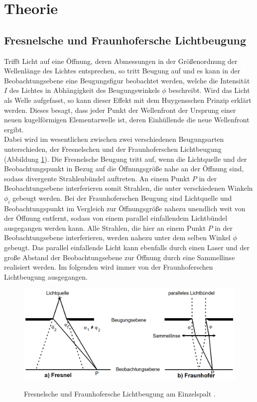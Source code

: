 
\section{Theorie}
\label{sec:Theorie}

\subsection{Fresnelsche und Fraunhofersche Lichtbeugung}

Trifft Licht auf eine Öffnung, deren Abmessungen in der Größenordnung der Wellenlänge des Lichtes entsprechen, so tritt Beugung auf und es kann in der Beobachtungsebene eine Beugungsfigur beobachtet werden, welche die Intensität $I$ des Lichtes in Abhängigkeit des Beugungswinkels $\phi$ beschreibt. 
Wird das Licht als Welle aufgefasst, so kann dieser Effekt mit dem Huygensschen Prinzip erklärt werden. Dieses besagt, dass jeder Punkt der Wellenfront der Ursprung einer neuen kugelförmigen Elementarwelle ist, deren Einhüllende die neue Wellenfront ergibt.\\
Dabei wird im wesentlichen zwischen zwei verschiedenen Beugungsarten unterschieden, der Fresnelschen  und der Fraunhoferschen Lichtbeugung (Abbildung \ref{fig:FFB}). Die Fresnelsche Beugung tritt auf, wenn die Lichtquelle und der Beobachtungspunkt in Bezug auf die Öffnungsgröße nahe an der Öffnung sind, sodass divergente Strahlenbündel auftreten. An einem Punkt $P$ in der Beobachtungsebene interferieren somit Strahlen, die unter verschiedenen Winkeln $\phi_i$ gebeugt werden. Bei der Fraunhoferschen Beugung sind Lichtquelle und Beobachtungspunkt im Vergleich zur Öffnungsgröße nahezu unendlich weit von der Öffnung entfernt, sodass von einem parallel einfallendem Lichtbündel ausgegangen werden kann. Alle Strahlen, die hier an einem Punkt $P$ in der Beobachtungsebene interferieren, werden nahezu unter dem selben Winkel $\phi$ gebeugt. Das parallel einfallende Licht kann ebenfalls durch einen Laser und der große Abstand der Beobachtungsebene zur Öffnung durch eine Sammellinse realisiert werden. Im folgenden wird immer von der Fraunhoferschen Lichtbeugung ausgegangen.

\begin{figure}
	\centering
	\caption{Fresnelsche und Fraunhofersche Lichtbeugung am Einzelspalt \cite{V406}.}
	\includegraphics[width=\linewidth-70pt,height=\textheight-70pt,keepaspectratio]{content/images/FresnelFrauenhoferBeugung.png}
	\label{fig:FFB}
\end{figure}

